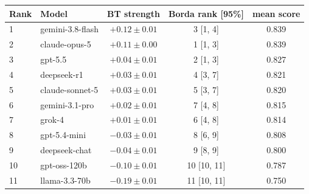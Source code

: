 \begin{tabular}{llccc}
\toprule
Rank & Model & BT strength & Borda rank [95\%] & mean score \\
\midrule
1 & gemini-3.8-flash & $+0.12 \pm 0.01$ & 3 [1, 4] & 0.839 \\
2 & claude-opus-5 & $+0.11 \pm 0.00$ & 1 [1, 3] & 0.839 \\
3 & gpt-5.5 & $+0.04 \pm 0.01$ & 2 [1, 3] & 0.827 \\
4 & deepseek-r1 & $+0.03 \pm 0.01$ & 4 [3, 7] & 0.821 \\
5 & claude-sonnet-5 & $+0.03 \pm 0.01$ & 5 [3, 7] & 0.820 \\
6 & gemini-3.1-pro & $+0.02 \pm 0.01$ & 7 [4, 8] & 0.815 \\
7 & grok-4 & $+0.01 \pm 0.01$ & 6 [4, 8] & 0.814 \\
8 & gpt-5.4-mini & $-0.03 \pm 0.01$ & 8 [6, 9] & 0.808 \\
9 & deepseek-chat & $-0.04 \pm 0.01$ & 9 [8, 9] & 0.800 \\
10 & gpt-oss-120b & $-0.10 \pm 0.01$ & 10 [10, 11] & 0.787 \\
11 & llama-3.3-70b & $-0.19 \pm 0.01$ & 11 [10, 11] & 0.750 \\
\bottomrule
\end{tabular}
